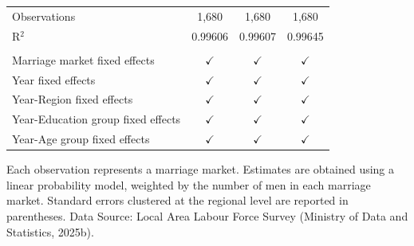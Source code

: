 \begin{table}[htbp]
\begin{tabular}{lccc}
       \\
      Observations                                & 1,680           & 1,680           & 1,680\\  
      R$^2$                                       & 0.99606         & 0.99607         & 0.99645\\  
       \\
      Marriage market fixed effects               & $\checkmark$    & $\checkmark$    & $\checkmark$\\   
      Year fixed effects                          & $\checkmark$    & $\checkmark$    & $\checkmark$\\   
      Year-Region fixed effects                   & $\checkmark$    & $\checkmark$    & $\checkmark$\\   
      Year-Education group fixed effects          & $\checkmark$    & $\checkmark$    & $\checkmark$\\   
      Year-Age group fixed effects                & $\checkmark$    & $\checkmark$    & $\checkmark$\\   
      \bottomrule
   \end{tabular}
   
   \par \raggedright 
   Each observation represents a marriage market. Estimates are obtained using a linear probability model, weighted by the number of men in each marriage market. Standard errors clustered at the regional level are reported in parentheses. Data Source: Local Area Labour Force Survey (Ministry of Data and Statistics, 2025b).
\end{table}


